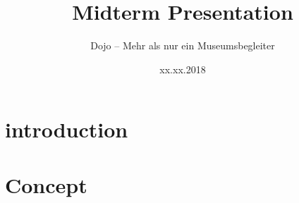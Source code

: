 \documentclass[10pt,ngerman]{beamer}
\title{Midterm Presentation}
\subtitle{Dojo -- Mehr als nur ein Museumsbegleiter}
\date{xx.xx.2018}
\begin{document}
\begin{frame}
\maketitle
\end{frame}

\begin{frame}
\tableofcontents
\end{frame}

\section{introduction}
\begin{frame}

\end{frame}

\begin{frame}

\end{frame}

\begin{frame}

\end{frame}

\section{Concept}
\begin{frame}

\end{frame}

\begin{frame}

\end{frame}

\begin{frame}

\end{frame}
\end{document}
